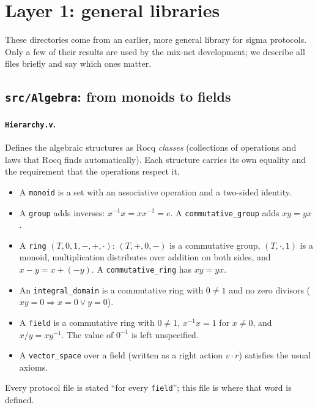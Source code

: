 \documentclass[11pt,a4paper]{article}
\theoremstyle{definition}
\theoremstyle{plain}
\begin{document}
\section{Layer 1: general libraries}
\label{sec:fm-lib}

These directories come from an earlier, more general library for sigma protocols. Only a few of
their results are used by the mix-net development; we describe all files briefly and say which
ones matter.

\subsection{\texttt{src/Algebra}: from monoids to fields}

\paragraph{\texttt{Hierarchy.v}.} Defines the algebraic structures as Rocq \emph{classes}
(collections of operations and laws that Rocq finds automatically). Each structure carries its own
equality and the requirement that the operations respect it.
\begin{itemize}[leftmargin=1.3em]
\item A \texttt{monoid} is a set with an associative operation and a two-sided identity.
\item A \texttt{group} adds inverses: $x^{-1}x=xx^{-1}=e$. A \texttt{commutative\_group} adds $xy=yx$.
\item A \texttt{ring} $(T,0,1,-,+,\cdot)$: $(T,+,0,-)$ is a commutative group, $(T,\cdot,1)$ is a
  monoid, multiplication distributes over addition on both sides, and $x-y=x+(-y)$. A
  \texttt{commutative\_ring} has $xy=yx$.
\item An \texttt{integral\_domain} is a commutative ring with $0\ne1$ and no zero divisors
  ($xy=0\Rightarrow x=0\lor y=0$).
\item A \texttt{field} is a commutative ring with $0\neq1$, $x^{-1}x=1$ for $x\ne0$, and
  $x/y=xy^{-1}$. The value of $0^{-1}$ is left unspecified.
\item A \texttt{vector\_space} over a field (written as a right action $v\cdot r$) satisfies the
  usual axioms.
\end{itemize}
Every protocol file is stated ``for every \texttt{field}''; this file is where that word is defined.
\end{document}
